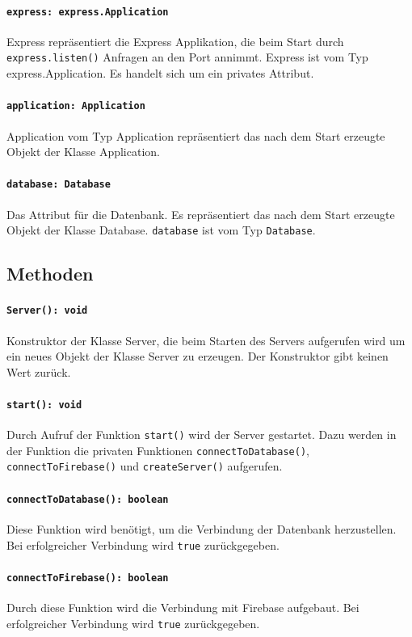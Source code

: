 \documentclass{entwurfsheft}
\begin{document}
\paragraph{\texttt{express: express.Application}}
Express repräsentiert die Express Applikation, die beim Start durch \texttt{express.listen()} Anfragen an den Port annimmt.
Express ist vom Typ express.Application. Es handelt sich um ein privates Attribut.
\paragraph{\texttt{application: Application}}
Application vom Typ Application repräsentiert das nach dem Start erzeugte Objekt der Klasse Application.
\paragraph{\texttt{database: Database}}
Das Attribut für die Datenbank. Es repräsentiert das nach dem Start erzeugte Objekt der Klasse Database. \texttt{database} ist vom Typ \texttt{Database}.

\subsection*{Methoden}
\paragraph{\texttt{Server(): void}}
Konstruktor der Klasse Server, die beim Starten des Servers aufgerufen wird um ein neues Objekt der Klasse Server zu erzeugen. Der Konstruktor gibt keinen Wert zurück.
\paragraph{\texttt{start(): void}}
Durch Aufruf der Funktion \texttt{start()} wird der Server gestartet. Dazu werden in der Funktion die privaten Funktionen \texttt{connectToDatabase()}, \texttt{connectToFirebase()} und \texttt{createServer()} aufgerufen.
\paragraph{\texttt{connectToDatabase(): boolean}}
Diese Funktion wird benötigt, um die Verbindung der Datenbank herzustellen. Bei erfolgreicher Verbindung wird \texttt{true} zurückgegeben.
\paragraph{\texttt{connectToFirebase(): boolean}}
Durch diese Funktion wird die Verbindung mit Firebase aufgebaut. Bei erfolgreicher Verbindung wird \texttt{true} zurückgegeben.
\end{document}
